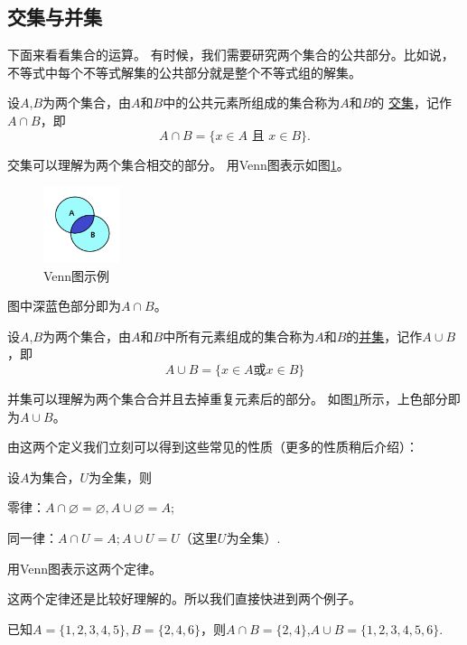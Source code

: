 \documentclass[lang=cn,math=cm,chinesefont=nofont,11pt,scheme=chinese,onecol]{elegantbook}
\begin{document}
\subsection{交集与并集}
下面来看看集合的运算。
有时候，我们需要研究两个集合的公共部分。比如说，不等式中每个不等式解集的公共部分就是整个不等式组的解集。
\begin{definition}[交集]
  设$A$,$B$为两个集合，由$A$和$B$中的公共元素所组成的集合称为$A$和$B$的
  \underline{交集}，记作$A\cap B$，即$$A\cap B=\{x\in A\text{ 且 }x\in B\}.$$
\end{definition}
  交集可以理解为两个集合相交的部分。
  用Venn图表示如图\ref{img:Venn2}。
  \begin{figure}[h]
    \centering
    \includegraphics[width=0.2\textwidth]{image/Venn2.png}
    \caption{Venn图示例}
    \label{img:Venn2}
  \end{figure}
  图中深蓝色部分即为$A\cap B$。

\begin{definition}
  设$A$,$B$为两个集合，由$A$和$B$中所有元素组成的集合称为$A$和$B$的\underline{并集}，记作$A\cup B$，即
  $$A\cup B=\{x\in A\text{或}x\in B\}$$
\end{definition}
  并集可以理解为两个集合合并且去掉重复元素后的部分。
  如图\ref{img:Venn2}所示，上色部分即为$A\cup B$。 

由这两个定义我们立刻可以得到这些常见的性质（更多的性质稍后介绍）：

设$A$为集合，$U$为全集，则
\begin{property}
  零律：$A\cap\varnothing =\varnothing,A\cup\varnothing=A$;
\end{property}
\begin{property}
  同一律：$A\cap U=A;A\cup U=U$（这里$U$为全集）.
\end{property}

\begin{exercise}\label{exer:10}
  用Venn图表示这两个定律。
\end{exercise}


这两个定律还是比较好理解的。所以我们直接快进到两个例子。

\begin{example}
  已知$A=\{1,2,3,4,5\},B=\{2,4,6\}$，则$A\cap B=\{2,4\}$,$A\cup B=\{1,2,3,4,5,6\}$.
\end{example}
\end{document}
